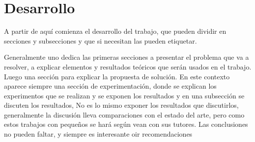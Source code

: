 \documentclass[a4paper,10pt,twocolumn]{article}
\begin{document}



\section{Desarrollo}\label{sec:dev}
A partir de aqu\'{i} comienza el desarrollo del trabajo, que pueden dividir en secciones y subsecciones y que si necesitan las pueden etiquetar.

Generalmente uno dedica las primeras secciones a presentar el problema que va a resolver, a explicar elementos y resultados te\'{o}ricos que ser\'{a}n usados en el trabajo. Luego una secci\'{o}n para explicar la propuesta de soluci\'{o}n.
En este contexto aparece siempre una secci\'{o}n de experimentaci\'{o}n, donde se explican los experimentos que se realizan y se exponen los resultados y en una subsecci\'{o}n se discuten los resultados, No es lo mismo exponer los resultados que discutirlos, generalmente la discusi\'{o}n lleva comparaciones con el estado del arte, pero como estos trabajos con peque\~{n}os se har\'{a} seg\'{u}n  vean con sus tutores.
Las conclusiones no pueden faltar, y siempre es interesante oir recomendaciones
 
 

	\subsection{}\label{}


\subsection{}










\end{document}
